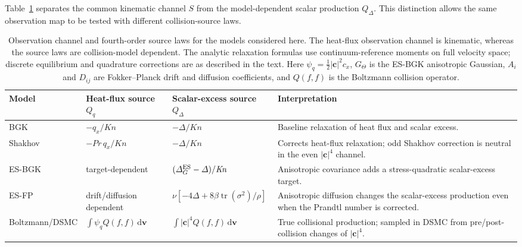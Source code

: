 \documentclass[lineno,paper]{JFM-FLM_Au}
\newenvironment{revision}{\nolinenumbers\begin{tcolorbox}[breakable,colback=revisionyellow,colframe=revisionyellow,boxrule=0pt,arc=0pt,left=5pt,right=5pt,top=5pt,bottom=5pt,before skip=6pt,after skip=6pt]\captionsetup{width=\linewidth}}{\end{tcolorbox}\linenumbers}
\newenvironment{revision}{}{}
\newcommand{\Kn}{\mathit{Kn}}
\newcommand{\dd}{\mathrm{d}}
\newcommand{\tr}{\operatorname{tr}}
\begin{document}
\begin{revision}

Table~\ref{tab:source_laws} separates the common kinematic channel $S$ from the model-dependent scalar production $Q_\Delta$. This distinction allows the same observation map to be tested with different collision-source laws.
\end{revision}

\begin{table}
  \begin{center}
  \caption{Observation channel and fourth-order source laws for the models considered here.  The heat-flux observation channel is kinematic, whereas the source laws are collision-model dependent.  The analytic relaxation formulas use continuum-reference moments on full velocity space; discrete equilibrium and quadrature corrections are as described in the text. Here $\psi_q=\frac12 |\boldsymbol c|^2c_x$, $G_\Theta$ is the ES-BGK anisotropic Gaussian, $A_i$ and $D_{ij}$ are Fokker--Planck drift and diffusion coefficients, and $Q(f,f)$ is the Boltzmann collision operator.}
  \label{tab:source_laws}
  \begin{tabular}{p{}p{}p{}p{}}
  \toprule
  Model & Heat-flux source $Q_q$ & Scalar-excess source $Q_\Delta$ & Interpretation\\
  \midrule
  BGK & $-q_x/\Kn$ & $-\Delta/\Kn$ & Baseline relaxation of heat flux and scalar excess.\\
  Shakhov & $-Pr\,q_x/\Kn$ & $-\Delta/\Kn$ & Corrects heat-flux relaxation; odd Shakhov correction is neutral in the even $|\boldsymbol c|^4$ channel.\\
  ES-BGK & target-dependent & $(\Delta_G^{\rm ES}-\Delta)/\Kn$ & Anisotropic covariance adds a stress-quadratic scalar-excess target.\\
  ES-FP & drift/diffusion dependent & $\nu[-4\Delta+8\beta\tr(\sigma^2)/\rho]$ & Anisotropic diffusion changes the scalar-excess production even when the Prandtl number is corrected.\\
  Boltzmann/DSMC & $\int \psi_q Q(f,f)\,\dd\boldsymbol v$ & $\int |\boldsymbol c|^4 Q(f,f)\,\dd\boldsymbol v$ & True collisional production; sampled in DSMC from pre/post-collision changes of $|\boldsymbol c|^4$.\\
  \bottomrule
  \end{tabular}
  \end{center}
\end{table}
\end{document}
